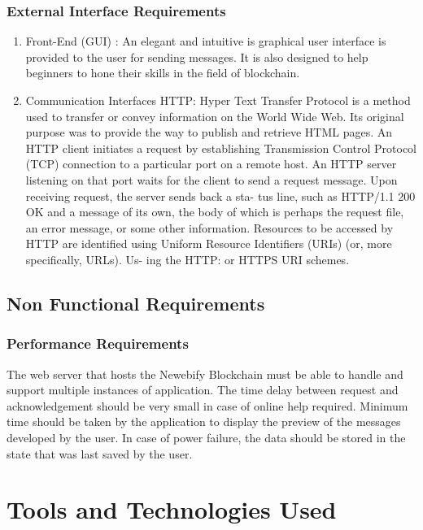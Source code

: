 \documentclass[12pt,a4paper]{article}
\begin{document}
\subsubsection{External Interface Requirements}
\begin{enumerate}
\item Front-End (GUI) : An elegant and intuitive is graphical user interface is provided to the user for sending messages. It is also designed to help beginners to hone their skills in the field of blockchain.
\item Communication Interfaces HTTP: Hyper Text Transfer Protocol is a method used to transfer or convey information on the World Wide Web. Its original purpose was to provide the way to publish and retrieve HTML pages.
An HTTP client initiates a request by establishing Transmission Control Protocol (TCP) connection to a particular port on a remote host. An HTTP server listening on that port waits for the client to send a request message. Upon receiving request, the server sends back a sta- tus line, such as HTTP/1.1 200 OK and a message of its own, the body of which is perhaps the request file, an error message, or some other information. Resources to be accessed by HTTP are identified using Uniform Resource Identifiers (URIs) (or, more specifically, URLs). Us- ing the HTTP: or HTTPS URI schemes.

\end{enumerate}

\subsection{Non Functional Requirements}
\subsubsection{Performance Requirements}
The web server that hosts the Newebify Blockchain must be able to handle and support multiple instances of application. The time delay between request and acknowledgement  should be very small in case of online help required. Minimum time should be taken by the application to display the preview of the messages developed by the user. In case of power failure, the data should be stored in the state that was last saved by the user.

\newpage

\section{Tools and Technologies Used}
\end{document}
